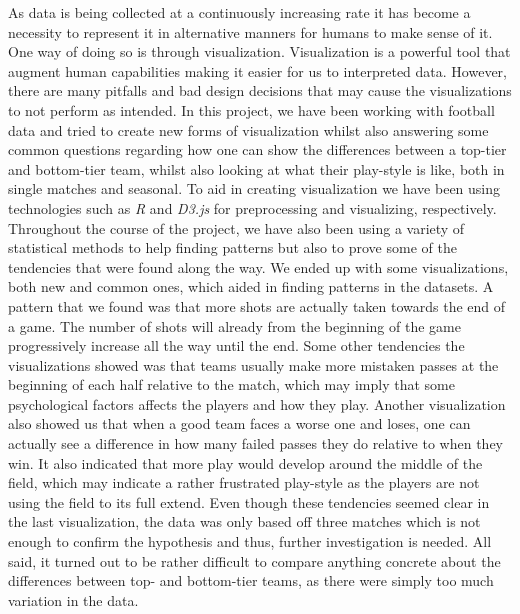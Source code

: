 \documentclass[Report.tex]{subfiles}
\begin{document}
 
As data is being collected at a continuously increasing rate it has become a necessity to represent it in alternative manners for humans to make sense of it. One way of doing so is through visualization. Visualization is a powerful tool that augment human capabilities making it easier for us to interpreted data. However, there are many pitfalls and bad design decisions that may cause the visualizations to not perform as intended. In this project, we have been working with football data and tried to create new forms of visualization whilst also answering some common questions regarding how one can show the differences between a top-tier and bottom-tier team, whilst also looking at what their play-style is like, both in single matches and seasonal. To aid in creating visualization we have been using technologies such as \textit{R} and \textit{D3.js} for preprocessing and visualizing, respectively. Throughout the course of the project, we have also been using a variety of statistical methods to help finding patterns but also to prove some of the tendencies that were found along the way. We ended up with some visualizations, both new and common ones, which aided in finding patterns in the datasets. A pattern that we found was that more shots are actually taken towards the end of a game. The number of shots will already from the beginning of the game progressively increase all the way until the end. Some other tendencies the visualizations showed was that teams usually make more mistaken passes at the beginning of each half relative to the match, which may imply that some psychological factors affects the players and how they play. Another visualization also showed us that when a good team faces a worse one and loses, one can actually see a difference in how many failed passes they do relative to when they win. It also indicated that more play would develop around the middle of the field, which may indicate a rather frustrated play-style as the players are not using the field to its full extend. Even though these tendencies seemed clear in the last visualization, the data was only based off three matches which is not enough to confirm the hypothesis and thus, further investigation is needed. All said, it turned out to be rather difficult to compare anything concrete about the differences between top- and bottom-tier teams, as there were simply too much variation in the data.
\end{document}
